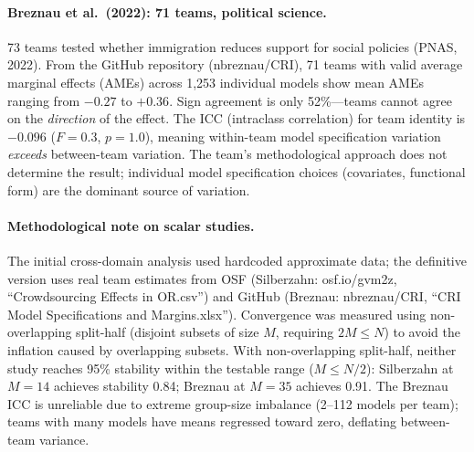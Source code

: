 \documentclass[11pt,a4paper]{article}
\begin{document}
\paragraph{Breznau et al.\ (2022): 71 teams, political science.}
73 teams tested whether immigration reduces support for social policies (PNAS, 2022).  From the GitHub repository (nbreznau/CRI), 71 teams with valid average marginal effects (AMEs) across 1{,}253 individual models show mean AMEs ranging from $-0.27$ to $+0.36$.  Sign agreement is only 52\%---teams cannot agree on the \emph{direction} of the effect.  The ICC (intraclass correlation) for team identity is $-0.096$ ($F = 0.3$, $p = 1.0$), meaning within-team model specification variation \emph{exceeds} between-team variation.  The team's methodological approach does not determine the result; individual model specification choices (covariates, functional form) are the dominant source of variation.

\paragraph{Methodological note on scalar studies.}
The initial cross-domain analysis used hardcoded approximate data; the definitive version uses real team estimates from OSF (Silberzahn: osf.io/gvm2z, ``Crowdsourcing Effects in OR.csv'') and GitHub (Breznau: nbreznau/CRI, ``CRI Model Specifications and Margins.xlsx'').  Convergence was measured using non-overlapping split-half (disjoint subsets of size $M$, requiring $2M \leq N$) to avoid the inflation caused by overlapping subsets.  With non-overlapping split-half, neither study reaches 95\% stability within the testable range ($M \leq N/2$): Silberzahn at $M = 14$ achieves stability 0.84; Breznau at $M = 35$ achieves 0.91.  The Breznau ICC is unreliable due to extreme group-size imbalance (2--112 models per team); teams with many models have means regressed toward zero, deflating between-team variance.
\end{document}
